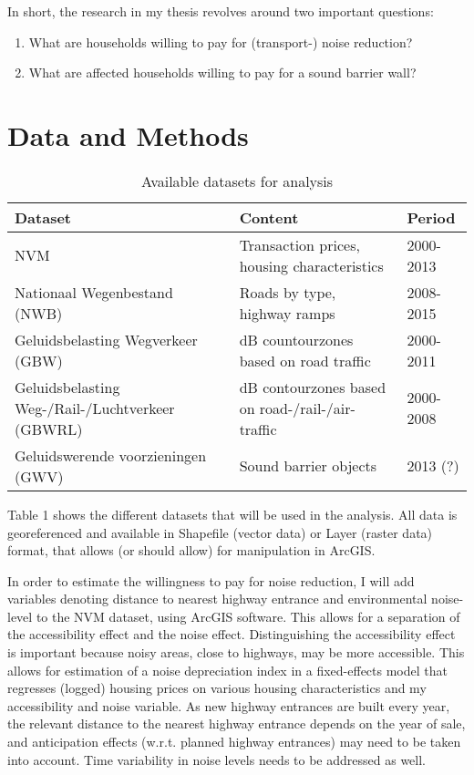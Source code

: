 \documentclass[]{scrartcl}
\begin{document}
In short, the research in my thesis revolves around two important questions:
\begin{enumerate}
	\item What are households willing to pay for (transport-) noise reduction?
	\item What are affected households willing to pay for a sound barrier wall?
\end{enumerate} 

\section{Data and Methods}

\begin{table}[!htbp]
	\centering%
	\caption{Available datasets for analysis}
\begin{tabular}{|m{} | m{} | m{} |}
	\hline
	\textbf{Dataset} & \textbf{Content} & \textbf{Period}\\
	\hline
	NVM & Transaction prices,  housing characteristics & 2000-2013\\
	\hline
	Nationaal Wegenbestand (NWB) & Roads by type, highway ramps & 2008-2015\\
	\hline
	Geluidsbelasting Wegverkeer (GBW) & dB countourzones based on road traffic & 2000-2011\\
	\hline
	Geluidsbelasting Weg-/Rail-/Luchtverkeer (GBWRL) & dB contourzones based on road-/rail-/air-traffic & 2000-2008\\
	\hline
	Geluidswerende voorzieningen (GWV) & Sound barrier objects & 2013 (?)\\
	\hline
\end{tabular}
\end{table}

Table 1 shows the different datasets that will be used in the analysis. All data is georeferenced and available in Shapefile (vector data) or Layer (raster data) format, that allows (or should allow) for manipulation in ArcGIS. 

In order to estimate the willingness to pay for noise reduction, I will add variables denoting distance to nearest highway entrance and environmental noise-level to the NVM dataset, using ArcGIS software. This allows for a separation of the accessibility effect and the noise effect. Distinguishing the accessibility effect is important because noisy areas, close to highways, may be more accessible.  This allows for estimation of a noise depreciation index in a fixed-effects model that regresses (logged) housing prices on various housing characteristics and my accessibility and noise variable. As new highway entrances are built every year, the relevant distance to the nearest highway entrance depends on the year of sale, and anticipation effects (w.r.t. planned highway entrances) may need to be taken into account. Time variability in noise levels needs to be addressed as well.
\end{document}
